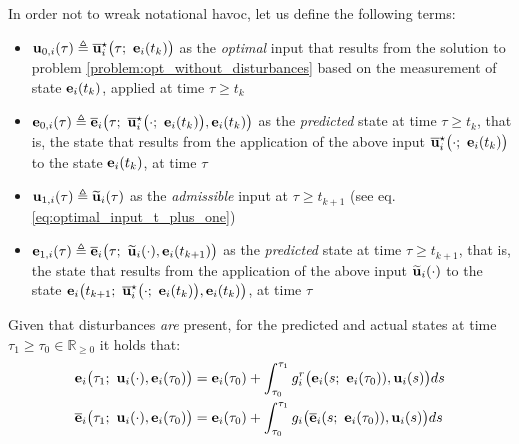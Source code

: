 In order not to wreak notational havoc, let us define the following terms:
\begin{gg_box}
\begin{itemize}
  \item $\bm{\mathbf{u}}_{0,i}(\tau) \triangleq \overline{\bm{\mathbf{u}}}_i^{\star}\big(\tau;\ \bm{\mathbf{e}}_i(t_k)\big)$
    as the \textit{optimal} input that results from the solution to problem
    \eqref{problem:opt_without_disturbances} based on the measurement of state
    $\bm{\mathbf{e}}_i(t_k)$, applied at time $\tau \geq t_k$
  \item $\vect{e}_{0,i}(\tau) \triangleq \overline{\vect{e}}_i\big(\tau;\ \overline{\vect{u}}_i^{\star}\big(\cdot;\ \vect{e}_i(t_k)\big), \vect{e}_i(t_k)\big)$
    as the \textit{predicted} state at time $\tau \geq t_k$, that is,
    the state that results from the application of the above input
    $\overline{\vect{u}}_i^{\star}\big(\cdot;\ \vect{e}_i(t_k)\big)$ to the
    state $\bm{\mathbf{e}}_i(t_k)$, at time $\tau$
  \item $\bm{\mathbf{u}}_{1,i}(\tau) \triangleq \widetilde{\bm{\mathbf{u}}}_i(\tau)$
    as the \textit{admissible} input at $\tau \geq t_{k+1}$ (see eq. \eqref{eq:optimal_input_t_plus_one})
  \item $\bm{\mathbf{e}}_{1,i}(\tau) \triangleq \overline{\bm{\mathbf{e}}}_i\big(\tau;\ \widetilde{\bm{\mathbf{u}}}_i(\cdot), \bm{\mathbf{e}}_i(t_{k+1})\big)$
    as the \textit{predicted} state at time $\tau \geq t_{k+1}$, that is,
    the state that results from the application of the above input
    $\widetilde{\bm{\mathbf{u}}}_i(\cdot)$ to the state
    $\vect{e}_i\big(t_{k+1};\ \overline{\vect{u}}_i^{\star}\big(\cdot;\ \vect{e}_i(t_k)\big), \vect{e}_i(t_k)\big)$, at time $\tau$
\end{itemize}
\end{gg_box}

\begin{bw_box}
  \begin{remark}
    Given that disturbances \textit{are} present, for the predicted and actual
    states at time $\tau_1 \geq \tau_0 \in \mathbb{R}_{\geq 0}$ it holds that:
    \begin{align}
      \bm{\mathbf{e}}_i\big(\tau_1;\ \bm{\mathbf{u}}_i(\cdot), \bm{\mathbf{e}}_i(\tau_0)\big) &=
        \bm{\mathbf{e}}_i(\tau_0) + \int_{\tau_0}^{\tau_1} g_i^r\big(\bm{\mathbf{e}}_i(s;\ \bm{\mathbf{e}}_i(\tau_0)), \bm{\mathbf{u}}_i(s)\big) ds \\
      \overline{\bm{\mathbf{e}}}_i\big(\tau_1;\ \bm{\mathbf{u}}_i(\cdot), \bm{\mathbf{e}}_i(\tau_0)\big) &=
        \bm{\mathbf{e}}_i(\tau_0) + \int_{\tau_0}^{\tau_1} g_i\big(\overline{\bm{\mathbf{e}}}_i(s;\ \bm{\mathbf{e}}_i(\tau_0)), \bm{\mathbf{u}}_i(s)\big) ds
    \end{align}
    \label{remark:predicted_actual_equations_with_disturbance}
  \end{remark}
\end{bw_box}

